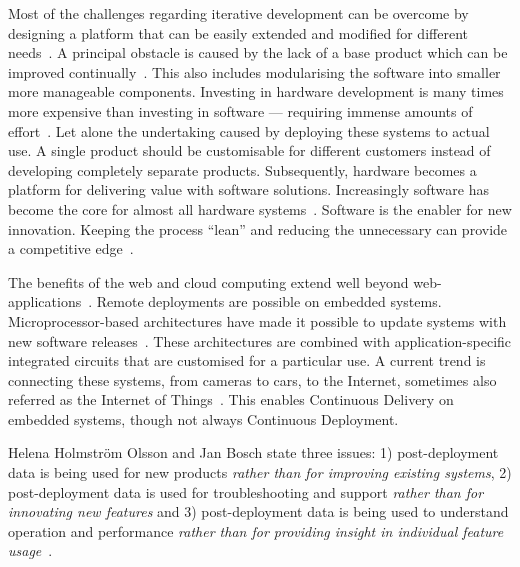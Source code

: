 \documentclass[english]{tktltiki2}
\begin{document}
Most of the challenges regarding iterative development can be overcome by designing a platform that can be easily extended and modified for different needs~\cite{KRM13}. A principal obstacle is caused by the lack of a base product which can be improved continually~\cite{HAB12}. This also includes modularising the software into smaller more manageable components. Investing in hardware development is many times more expensive than investing in software — requiring immense amounts of effort~\cite{BE12}. Let alone the undertaking caused by deploying these systems to actual use. A single product should be customisable for different customers instead of developing completely separate products. Subsequently, hardware becomes a platform for delivering value with software solutions. Increasingly software has become the core for almost all hardware systems~\cite{BE12}. Software is the enabler for new innovation. Keeping the process “lean” and reducing the unnecessary can provide a competitive edge~\cite{CWR10}.

The benefits of the web and cloud computing extend well beyond web-applications~\cite{BE12}. Remote deployments are possible on embedded systems. Microprocessor-based architectures have made it possible to update systems with new software releases~\cite{RA03}. These architectures are combined with application-specific integrated circuits that are customised for a particular use. A current trend is connecting these systems, from cameras to cars, to the Internet, sometimes also referred as the Internet of Things~\cite{BE12, HB14}. This enables Continuous Delivery on embedded systems, though not always Continuous Deployment.

Helena Holmström Olsson and Jan Bosch state three issues: 1) post-deployment data is being used for new products \emph{rather than for improving existing systems}, 2) post-deployment data is used for troubleshooting and support \emph{rather than for innovating new features} and 3) post-deployment data is being used to understand operation and performance \emph{rather than for providing insight in individual feature usage}~\cite{HB14}.
\end{document}
